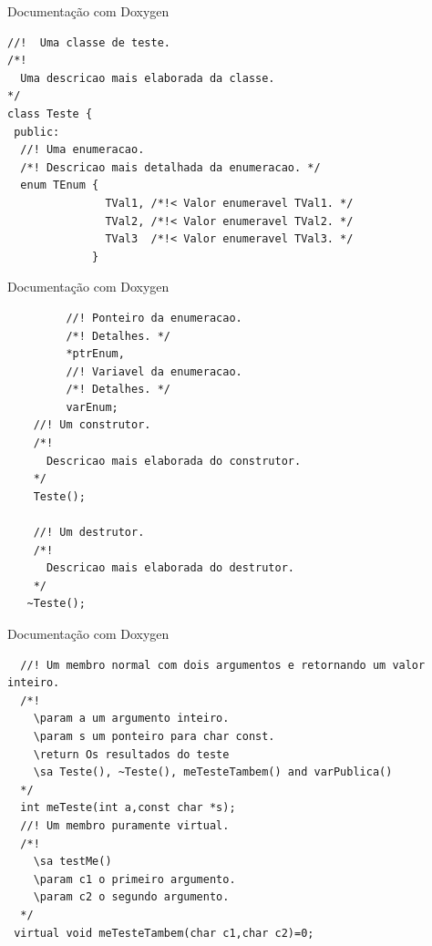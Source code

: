 \documentclass[12pt,table,xcolor={dvipsnames}]{beamer}
\begin{document}
\begin{frame}[fragile]{Documentação com Doxygen}
\begin{lstlisting}
//!  Uma classe de teste.
/*!
  Uma descricao mais elaborada da classe.
*/
class Teste {
 public:
  //! Uma enumeracao.
  /*! Descricao mais detalhada da enumeracao. */
  enum TEnum {
               TVal1, /*!< Valor enumeravel TVal1. */
               TVal2, /*!< Valor enumeravel TVal2. */
               TVal3  /*!< Valor enumeravel TVal3. */
             }

\end{lstlisting}
\end{frame}

\begin{frame}[fragile]{Documentação com Doxygen}
\begin{lstlisting}
         //! Ponteiro da enumeracao.
         /*! Detalhes. */
         *ptrEnum,
         //! Variavel da enumeracao.
         /*! Detalhes. */
         varEnum;
    //! Um construtor.
    /*!
      Descricao mais elaborada do construtor.
    */
    Teste();

    //! Um destrutor.
    /*!
      Descricao mais elaborada do destrutor.
    */
   ~Teste();
\end{lstlisting}
\end{frame}

\begin{frame}[fragile]{Documentação com Doxygen}
\begin{lstlisting}
  //! Um membro normal com dois argumentos e retornando um valor inteiro.
  /*!
    \param a um argumento inteiro.
    \param s um ponteiro para char const.
    \return Os resultados do teste
    \sa Teste(), ~Teste(), meTesteTambem() and varPublica()
  */
  int meTeste(int a,const char *s);
  //! Um membro puramente virtual.
  /*!
    \sa testMe()
    \param c1 o primeiro argumento.
    \param c2 o segundo argumento.
  */
 virtual void meTesteTambem(char c1,char c2)=0;
\end{lstlisting}
\end{frame}
\end{document}
